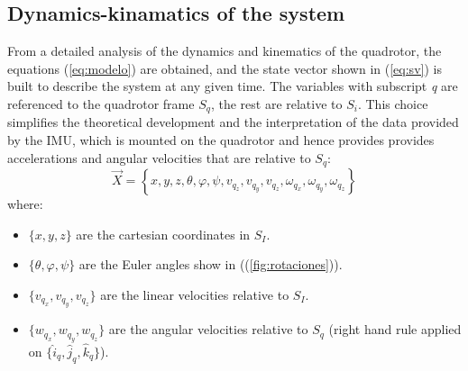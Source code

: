 \documentclass[conference]{IEEEtran}
\newcommand{\refp}[1]{(\ref{#1})}
\begin{document}
\subsection{Dynamics-kinamatics of the system}
\label{sec:modelo-dyn-kin}

From a detailed analysis of the dynamics and kinematics of the quadrotor, the equations \refp{eq:modelo} are obtained, and the state vector shown in \refp{eq:sv} is built to describe the system at any given time. The variables with subscript \textit{q} are referenced to the quadrotor frame $S_q$, the rest are relative to $S_i$. This choice simplifies the theoretical development and the interpretation of the data provided by the IMU, which is mounted on the quadrotor and hence provides provides accelerations and angular velocities that are relative to $S_q$:
\begin{equation}
\vec{X}=\left\lbrace  x,y,z, \theta,\varphi,\psi, v_{q_z},v_{q_y},v_{q_z},\omega_{q_x},\omega_{q_y},\omega_{q_z} \right\rbrace
\label{eq:sv}
\end{equation}
where:
\begin{itemize}
\item $\lbrace x,y,z \rbrace$ are the cartesian coordinates in $S_I$.
\item $\lbrace\theta,\varphi,\psi\rbrace$ are the Euler angles show in (\refp{fig:rotaciones}).
\item $\lbrace v_{q_x},v_{q_y},v_{q_z}\rbrace$ are the linear velocities relative to $S_I$.
\item $\lbrace w_{q_x},w_{q_y},w_{q_z}\rbrace$ are the angular velocities relative to $S_q$ (right hand rule applied on $\lbrace \hat{i}_q,\hat{j}_q,\hat{k}_q\rbrace$).
\end{itemize}
\end{document}
